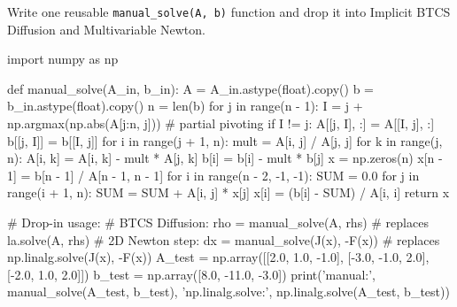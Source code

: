 \documentclass[10pt,a4paper]{article}
\begin{document}
\begin{goalbox}
Write one reusable \texttt{manual\_solve(A, b)} function and drop it into Implicit BTCS Diffusion and Multivariable Newton.
\end{goalbox}

\begin{jupytercode}
import numpy as np

def manual_solve(A_in, b_in):
    A = A_in.astype(float).copy()
    b = b_in.astype(float).copy()
    n = len(b)
    for j in range(n - 1):
        I = j + np.argmax(np.abs(A[j:n, j]))   # partial pivoting
        if I != j:
            A[[j, I], :] = A[[I, j], :]
            b[[j, I]] = b[[I, j]]
        for i in range(j + 1, n):
            mult = A[i, j] / A[j, j]
            for k in range(j, n):
                A[i, k] = A[i, k] - mult * A[j, k]
            b[i] = b[i] - mult * b[j]
    x = np.zeros(n)
    x[n - 1] = b[n - 1] / A[n - 1, n - 1]
    for i in range(n - 2, -1, -1):
        SUM = 0.0
        for j in range(i + 1, n):
            SUM = SUM + A[i, j] * x[j]
        x[i] = (b[i] - SUM) / A[i, i]
    return x

# Drop-in usage:
#   BTCS Diffusion:  rho = manual_solve(A, rhs)         # replaces la.solve(A, rhs)
#   2D Newton step:  dx  = manual_solve(J(x), -F(x))    # replaces np.linalg.solve(J(x), -F(x))
A_test = np.array([[2.0, 1.0, -1.0], [-3.0, -1.0, 2.0], [-2.0, 1.0, 2.0]])
b_test = np.array([8.0, -11.0, -3.0])
print('manual:', manual_solve(A_test, b_test), 'np.linalg.solve:', np.linalg.solve(A_test, b_test))
\end{jupytercode}
\end{document}
